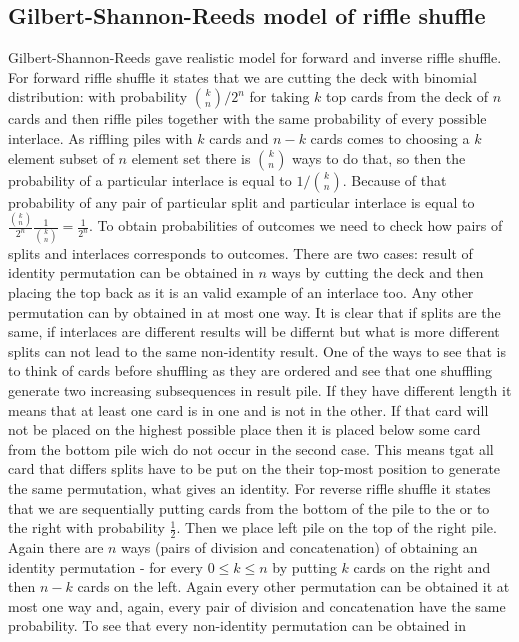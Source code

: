 \documentclass[a4paper, 12pt]{article}
\begin{document}
\subsection{Gilbert-Shannon-Reeds model of riffle shuffle}
Gilbert-Shannon-Reeds gave realistic model for forward and inverse riffle shuffle.
For forward riffle shuffle it states that we are cutting the deck with binomial distribution:
with probability $\binom{k}{n}/2^n$ for taking $k$ top cards from the deck of $n$ cards
and then riffle piles together with the same probability of every possible interlace. As riffling piles with
$k$ cards and $n-k$ cards comes to choosing a $k$ element subset of $n$ element set there is $\binom{k}{n}$
ways to do that, so then the probability of a particular interlace is equal to $1/\binom{k}{n}$.
Because of that probability of any pair of particular split and particular interlace is equal to
$\frac{\binom{k}{n}}{2^n}\frac{1}{\binom{k}{n}} = \frac{1}{2^n}$. To obtain probabilities of outcomes
we need to check how pairs of splits and interlaces corresponds to outcomes. There are two cases:
result of identity permutation can be obtained in $n$ ways by cutting the deck and then placing the top back
as it is an valid example of an interlace too. Any other permutation can by obtained in at most one way.
It is clear that if splits are the same, if interlaces are different results will be differnt but what is
more different splits can not lead to the same non-identity result. One of the ways to see that is to think
of cards before shuffling as they are ordered and see that one shuffling generate two increasing subsequences
in result pile. If they have different length it means that at least one card is in one and is not
in the other. If that card will not be placed on the highest possible place then it is placed below some
card from the bottom pile wich do not occur in the second case. This means tgat all card that differs splits
have to be put on the their top-most position to generate the same permutation, what gives an identity.
For reverse riffle shuffle it states that we are sequentially putting cards from the bottom of the pile to
the or to the right with probability $\frac{1}{2}$. Then we place left pile on the top of the right pile.
Again there are $n$ ways (pairs of division and concatenation) of obtaining an identity permutation -
for every $0 \leq k \leq n$ by putting $k$ cards on the right and then $n-k$ cards on the left.
Again every other permutation can be obtained it at most one way and, again, every pair of division and
concatenation have the same probability. To see that every non-identity permutation can be obtained in
\end{document}
